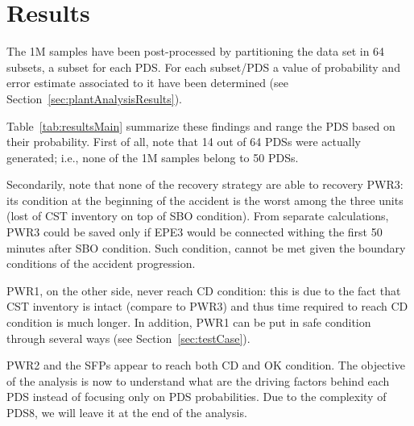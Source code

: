 \section{Results}
\label{sec:results}
The 1M samples have been post-processed by partitioning the data set in 64 subsets, a subset for each
PDS. 
For each subset/PDS a value of probability and error estimate associated to it have been determined 
(see Section~\ref{sec:plantAnalysisResults}).

Table~\ref{tab:resultsMain} summarize these findings and range the PDS based on their probability.
First of all, note that 14 out of 64 PDSs were actually generated; i.e., none of the 1M samples 
belong to 50 PDSs.

Secondarily, note that none of the recovery strategy are able to recovery PWR3: its condition at 
the beginning of the accident is the worst among the three units (lost of CST inventory on top of 
SBO condition). From separate calculations, PWR3 could be saved only if EPE3 would be connected
withing the first 50 minutes after SBO condition. Such condition, cannot be met given the boundary
conditions of the accident progression.

PWR1, on the other side, never reach CD condition: this is due to the fact that CST inventory is 
intact (compare to PWR3) and thus time required to reach CD condition is much longer. In addition,
PWR1 can be put in safe condition through several ways (see Section~\ref{sec:testCase}).

PWR2 and the SFPs appear to reach both CD and OK condition. The objective of the analysis is now 
to understand what are the driving factors behind each PDS instead of focusing only on PDS 
probabilities. Due to the complexity of PDS8, we will leave it at the end of the analysis.


